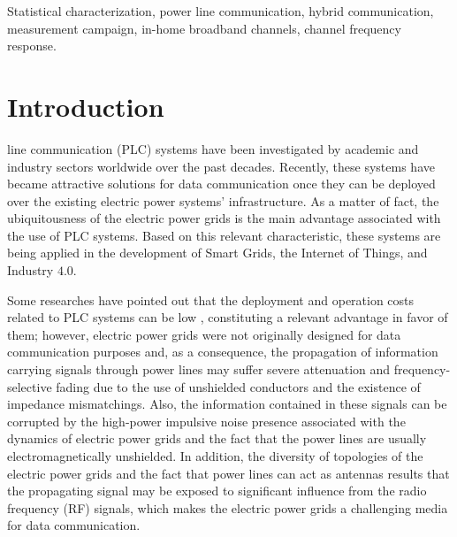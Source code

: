 \documentclass[journal]{IEEEtran}
\begin{document}
\begin{IEEEkeywords}
Statistical characterization, power line communication, hybrid communication, measurement campaign, in-home broadband channels, channel frequency response.
\end{IEEEkeywords}

\IEEEpeerreviewmaketitle

\section{Introduction}

 line communication (PLC) systems have been investigated by academic and industry sectors worldwide over the past decades. Recently, these systems have became attractive solutions for data communication once they can be deployed over the existing electric power systems' infrastructure. As a matter of fact, the ubiquitousness of the electric power grids is the main advantage associated with the use of \ac{PLC} systems. Based on this relevant characteristic, these systems are being applied in the development of Smart Grids, the Internet of Things, and Industry $4.0$. 

Some researches have pointed out that the deployment and operation costs related to \ac{PLC} systems can be low \cite{Hrasnica:PLC_design, Dib}, constituting a relevant advantage in favor of them; however, electric power grids were not originally designed for data communication purposes and, as a consequence, the propagation of information carrying signals through power lines may suffer severe attenuation and frequency-selective fading due to the use of unshielded conductors and the existence of impedance mismatchings. Also, the information contained in these signals can be corrupted by the high-power impulsive noise presence associated with the dynamics of electric power grids and the fact that the power lines are usually electromagnetically unshielded. In addition, the diversity of topologies of the electric power grids and the fact that power lines can act as antennas results that the propagating signal may be exposed to significant influence from the radio frequency (RF) signals, which makes the electric power grids a challenging media for data communication.  
\end{document}
